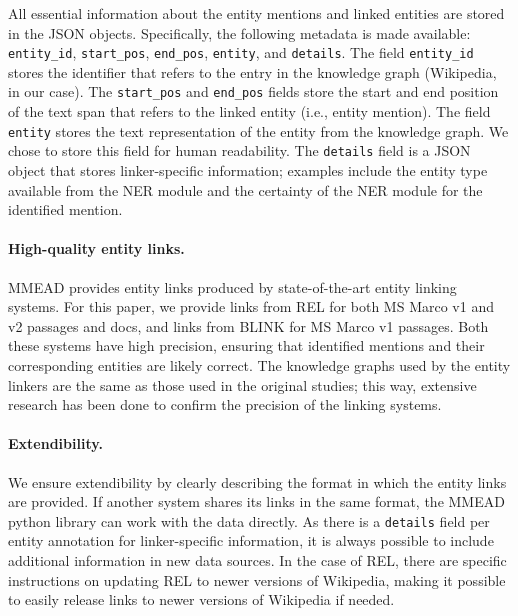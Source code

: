 
All essential information about the entity mentions and linked entities are stored in the JSON objects. %
Specifically, the following metadata is made available: \texttt{entity\_id}, \texttt{start\_pos}, \texttt{end\_pos}, \texttt{entity}, and \texttt{details}. The field \texttt{entity\_id} stores the identifier that refers to the entry in the knowledge graph (Wikipedia, in our case). The \texttt{start\_pos} and \texttt{end\_pos} fields store the start and end position of the text span that refers to the linked entity (i.e., entity mention). The field \texttt{entity} stores the text representation of the entity from the knowledge graph. 
We chose to store this field for human readability. The \texttt{details} field is a JSON object that stores linker-specific information; examples include the entity type available from the NER module and the certainty of the NER module for the identified mention.

\paragraph{High-quality entity links.} MMEAD provides entity links produced by state-of-the-art entity linking systems. For this paper, we provide links from REL for both MS Marco v1 and v2 passages and docs, and links from BLINK for MS Marco v1 passages. Both these systems have high precision, ensuring that identified mentions and their corresponding entities are likely correct. The knowledge graphs used by the entity linkers are the same as those used in the original studies; this way, extensive research has been done to confirm the precision of the linking systems.

\paragraph{Extendibility.} We ensure extendibility by clearly describing the format in which the entity links are provided. If another system shares its links in the same format, the MMEAD python library can work with the data directly. As there is a \texttt{details} field per entity annotation for linker-specific information, it is always possible to include additional information in new data sources. In the case of REL, there are specific instructions on updating REL to newer versions of Wikipedia, making it possible to easily release links to newer versions of Wikipedia if needed.

